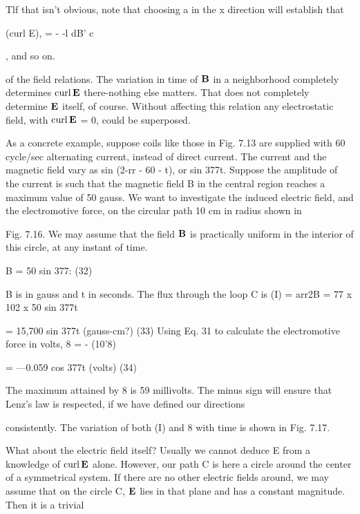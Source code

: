 Tlf that isn't obvious, note that choosing a in the x direction will establish that

(curl E), = - -l dB'
c

, and so on.

of the field relations. The variation in time of $\mathbf{B}$ in a neighborhood
completely determines $\operatorname{curl}\mathbf{E}$ there-nothing else matters. That
does not completely determine $\mathbf{E}$ itself, of course. Without affecting
this relation any electrostatic field, with $\operatorname{curl}\mathbf{E}$ = 0, could be
superposed.

As a concrete example, suppose coils like those in Fig. 7.13 are
supplied with 60 cycle/sec alternating current, instead of direct
current. The current and the magnetic field vary as sin (2-rr - 60 - t),
or sin 377t. Suppose the amplitude of the current is such that the
magnetic field B in the central region reaches a maximum value of
50 gauss. We want to investigate the induced electric field, and the
electromotive force, on the circular path 10 cm in radius shown in

Fig. 7.16. We may assume that the field $\mathbf{B}$ is practically uniform in
the interior of this circle, at any instant of time.

\begin{equation}
\end{equation}
B = 50 sin 377: (32)

B is in gauss and t in seconds. The flux through the loop C is
(I) = arr2B = 77 x 102 x 50 sin 377t

\begin{equation}
\end{equation}
= 15,700 sin 377t (gauss-cm?) (33)
Using Eq. 31 to calculate the electromotive force in volts,
8 = - (10'8)%

\begin{equation}
\end{equation}
= ---0.059 cos 377t (volts) (34)

The maximum attained by 8 is 59 millivolts. The minus sign will
ensure that Lenz's law is respected, if we have defined our directions

consistently. The variation of both (I) and 8 with time is shown in
Fig. 7.17.

What about the electric field itself? Usually we cannot deduce
E from a knowledge of $\operatorname{curl}\mathbf{E}$ alone. However, our path C is here a
circle around the center of a symmetrical system. If there are no
other electric fields around, we may assume that on the circle C, $\mathbf{E}$ lies
in that plane and has a constant magnitude. Then it is a trivial

